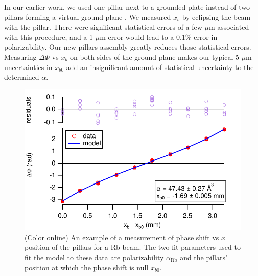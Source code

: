 \documentclass[twocolumn,prl,showpacs,superscriptaddress,longbibliography]{revtex4-1}   %
\newcommand{\arb}{\alpha_{\textrm{Rb}}}
\begin{document}
In our earlier work, we used one pillar next to a grounded plate instead of two pillars forming a virtual ground plane \cite{Holmgren2010}. We measured $x_b$ by eclipsing the beam with the pillar. There were significant statistical errors of a few $\mu$m associated with this procedure, and a 1 $\mu$m error would lead to a 0.1\% error in polarizability. 
Our new pillars assembly greatly reduces those statistical errors. Measuring $\Delta\Phi$ vs $x_b$ on both sides of the ground plane makes our typical 5 $\mu$m uncertainties in $x_{b0}$ add an insignificant amount of 
statistical uncertainty to the determined $\alpha$.

\begin{figure}
\includegraphics[width=\linewidth,keepaspectratio]{dPvMP_150327_q.pdf}
\caption{\label{dPvMPExample}(Color online) An example of a measurement of phase shift vs $x$ position of the pillars for a Rb beam. The two fit parameters used to fit the model to these data are polarizability $\arb$ and the pillars' position at which the phase shift is null $x_{b0}$.}
\end{figure}
\end{document}
